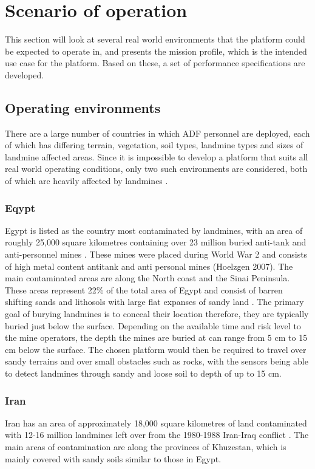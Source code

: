 \documentclass[main.tex]{subfiles}
\begin{document}
\section{Scenario of operation}
This section will look at several real world environments that the platform could be expected to operate in, and presents the mission profile, which is the intended use case for the platform. Based on these, a set of performance specifications are developed.  

\subsection{Operating environments}
There are a large number of countries in which ADF personnel are deployed, each of which has differing terrain, vegetation, soil types, landmine types and sizes of landmine affected areas. Since it is impossible to develop a platform that suits all real world operating conditions, only two such environments are considered, both of which are heavily affected by landmines \parencite{AustralianGovernment2016}. 

\subsubsection{Eqypt}
Egypt is listed as the country most contaminated by landmines, with an area of roughly 25,000 square kilometres containing over 23 million buried anti-tank and anti-personnel mines \parencite{Rushfan2008}. These mines were placed during World War 2 and consists of high metal content antitank and anti personal mines (Hoelzgen 2007). The main contaminated areas are along the North coast and the Sinai Peninsula. These areas represent 22\% of the total area of Egypt and consist of barren shifting sands and lithosols with large flat expanses of sandy land \parencite{Nahrawy2011}. The primary goal of burying landmines is to conceal their location therefore, they are typically buried just below the surface. Depending on the available time and risk level to the mine operators, the depth the mines are buried at can range from 5 cm to 15 cm below the surface. The chosen platform would then be required to travel over sandy terrains and over small obstacles such as rocks, with the sensors being able to detect landmines through sandy and loose soil to depth of up to 15 cm. 
 \subsubsection{Iran}
Iran has an area of approximately 18,000 square kilometres of land contaminated with 12-16 million landmines left over from the 1980-1988 Iran-Iraq conflict \parencite{landmineMonitor2015}. The main areas of contamination are along the provinces of Khuzestan, which is mainly covered with sandy soils similar to those in Egypt. 
\end{document}
